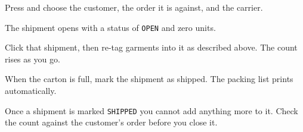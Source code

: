 \begin{steps}
  \item Press  and choose the customer, the order it is
        against, and the carrier.
  \item The shipment opens with a status of \texttt{OPEN} and zero units.
  \item Click that shipment, then re-tag garments into it as described above.
        The  count rises as you go.
  \item When the carton is full, mark the shipment as shipped. The packing list
        prints automatically.
\end{steps}

\begin{warnbox}
Once a shipment is marked \texttt{SHIPPED} you cannot add anything more to it.
Check the  count against the customer's order before you close it.
\end{warnbox}
